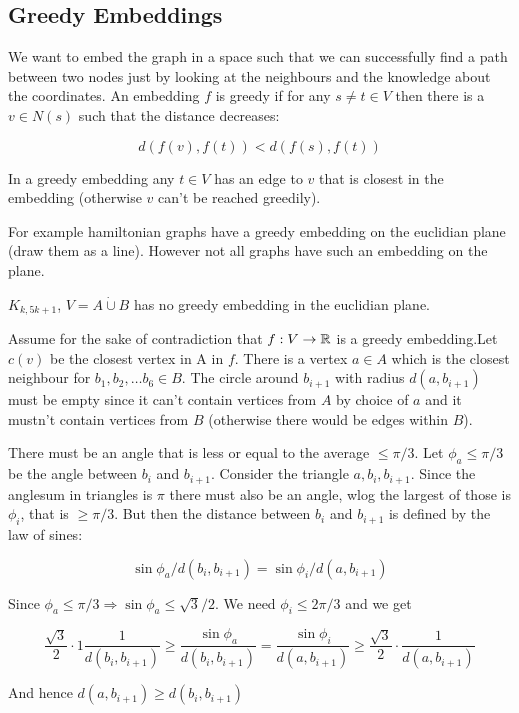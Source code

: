 

\subsection{Greedy Embeddings}

We want to embed the graph in a space such that we can successfully find a path between two nodes just by looking at the neighbours and the knowledge about the coordinates. An embedding $f$ is greedy if for any $s\neq t\in V$ then there is a $v\in N(s)$ such that the distance decreases:

\[d(f(v),f(t)) < d(f(s),f(t))\]

In a greedy embedding any $t\in V$ has an edge to $v$ that is closest in the embedding (otherwise $v$ can't be reached greedily).

For example hamiltonian graphs have a greedy embedding on the euclidian plane (draw them as a line). However not all graphs have such an embedding on the plane.

\begin{lem} $K_{k,5k+1}$, $V=A\dot \cup B$ has no greedy embedding in the euclidian plane. 
\end{lem}

\begin{pr} Assume for the sake of contradiction that $f:V\rightarrow \mathbb{R}$ is a greedy embedding.Let $c(v)$ be the closest vertex in A in $f$. There is a vertex $a\in A$ which is the closest neighbour for $b_1,b_2,\ldots b_6\in B$. The circle around $b_{i+1}$ with radius $d(a,b_{i+1})$ must be empty since it can't contain vertices from $A$ by choice of $a$ and it mustn't contain vertices from $B$ (otherwise there would be edges within $B$). 


There must be an angle that is less or equal to the average $\leq \pi/3$. Let $\phi_a\leq \pi/3$ be the angle between $b_i$ and $b_{i+1}$. Consider the triangle $a,b_i,b_{i+1}$. Since the anglesum in triangles is $\pi$ there must also be an angle, wlog the largest of those is $\phi_i$, that is $\geq \pi/3$. But then the distance between $b_i$ and $b_{i+1}$ is defined by the law of sines:

\[\sin \phi_a / d(b_i,b_{i+1}) = \sin \phi_i / d(a,b_{i+1})\]

Since $\phi_a \leq \pi/3 \Rightarrow \sin \phi_a \leq \sqrt{3}/2$. We need $\phi_i\leq 2\pi/3$ and we get

\[\frac{\sqrt{3}}2 \cdot 1\frac{1}{d(b_i,b_{i+1})} \geq \frac{\sin \phi_a}{d(b_i,b_{i+1})} = \frac{\sin \phi_i}{d(a,b_{i+1})} \geq \frac{\sqrt 3}{2} \cdot \frac{1}{d(a,b_{i+1})}\]

And hence $d(a,b_{i+1})\geq d(b_i,b_{i+1})$
\end{pr}

